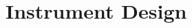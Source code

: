 \documentclass[ignorenonframetext]{beamer}
\begin{document}
% 



%


%



\section{Instrument Design}

\frame{\tableofcontents[currentsection]}

% 
% 
\end{document}
